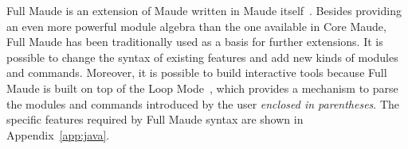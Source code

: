 Full Maude is an extension of Maude written in Maude itself~\cite[Part II]{maude-book}. Besides
providing an even more powerful module algebra than the one available in Core Maude,
Full Maude has been traditionally used as a basis for further extensions. It is possible
to change the syntax of existing features and add new kinds of modules and commands.
Moreover, it is possible to build interactive tools because Full Maude is built on top
of the Loop Mode~\cite[Chapter~17]{maude-book}, which provides a mechanism to parse the
modules and commands introduced by the user \emph{enclosed in parentheses}. The specific
features required by Full Maude syntax are shown in Appendix~\ref{app:java}.


